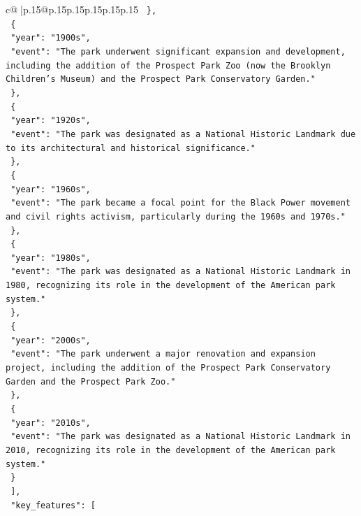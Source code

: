 \documentclass{article}
\begin{document}
{\begin{supertabular}{c@{$\;$}|p{.15\linewidth}@{}p{.15\linewidth}p{.15\linewidth}p{.15\linewidth}p{.15\linewidth}p{.15\linewidth}}
{{{\texttt{    \},} \\
\texttt{    \{} \\
\texttt{      "year": "1900s",} \\
\texttt{      "event": "The park underwent significant expansion and development, including the addition of the Prospect Park Zoo (now the Brooklyn Children's Museum) and the Prospect Park Conservatory Garden."} \\
\texttt{    \},} \\
\texttt{    \{} \\
\texttt{      "year": "1920s",} \\
\texttt{      "event": "The park was designated as a National Historic Landmark due to its architectural and historical significance."} \\
\texttt{    \},} \\
\texttt{    \{} \\
\texttt{      "year": "1960s",} \\
\texttt{      "event": "The park became a focal point for the Black Power movement and civil rights activism, particularly during the 1960s and 1970s."} \\
\texttt{    \},} \\
\texttt{    \{} \\
\texttt{      "year": "1980s",} \\
\texttt{      "event": "The park was designated as a National Historic Landmark in 1980, recognizing its role in the development of the American park system."} \\
\texttt{    \},} \\
\texttt{    \{} \\
\texttt{      "year": "2000s",} \\
\texttt{      "event": "The park underwent a major renovation and expansion project, including the addition of the Prospect Park Conservatory Garden and the Prospect Park Zoo."} \\
\texttt{    \},} \\
\texttt{    \{} \\
\texttt{      "year": "2010s",} \\
\texttt{      "event": "The park was designated as a National Historic Landmark in 2010, recognizing its role in the development of the American park system."} \\
\texttt{    \}} \\
\texttt{  {]},} \\
\texttt{  "key\_features": {[}} \\
}}}
\end{supertabular}}
\end{document}
